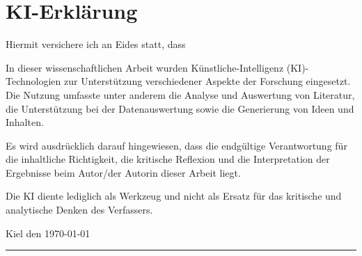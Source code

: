 \section*{KI-Erklärung}


Hiermit versichere ich an Eides statt, dass


In dieser wissenschaftlichen Arbeit wurden Künstliche-Intelligenz (KI)-Technologien zur Unterstützung verschiedener Aspekte der Forschung eingesetzt. Die Nutzung umfasste unter anderem die Analyse und Auswertung von Literatur, die Unterstützung bei der Datenauswertung sowie die Generierung von Ideen und Inhalten.

Es wird ausdrücklich darauf hingewiesen, dass die endgültige Verantwortung für die inhaltliche Richtigkeit, die kritische Reflexion und die Interpretation der Ergebnisse beim Autor/der Autorin dieser Arbeit liegt.

Die KI diente lediglich als Werkzeug und nicht als Ersatz für das kritische und analytische Denken des Verfassers.


Kiel den \today

\vspace{1cm} %

\rule{6cm}{1pt} %
\\ %
\me %